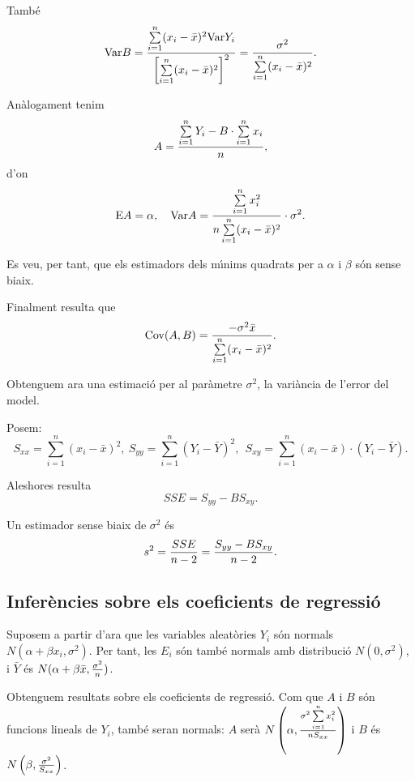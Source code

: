 Tamb\'e
$${\rm Var} B = {\sum\limits_{i=1}^n (x_i - \bar{x})^2 {\rm Var} Y_i \over \left[
\sum\limits_{i=1}^n (x_i - \bar{x})^2 \right]^2} = {\sigma^2 \over
\sum\limits_{i=1}^n (x_i - \bar{x})^2}.$$

An\`alogament tenim
$$A = {\sum\limits_{i=1}^n Y_i - B \cdot \sum\limits_{i=1}^n x_i \over n},$$
d'on
$${\rm E}A = \alpha, \quad{\rm Var} A = {\sum\limits_{i=1}^n x_i^2 \over n
\sum\limits_{i=1}^n (x_i - \bar{x})^2} \cdot \sigma^2.$$

Es veu, per tant, que els estimadors dels m\'{\i}nims quadrats per a $\alpha$ i 
$\beta$ s\'on sense biaix.

Finalment resulta que
$${\rm Cov} (A,B) = {- \sigma^2 \bar{x} \over \sum\limits_{i=1}^n (x_i - \bar{x})^2}.$$

Obtenguem ara una estimaci\'o per al par\`ametre $\sigma^2$, la vari\`ancia de
l'error del model.

Posem:
$$S_{xx} = \sum_{i=1}^n (x_i - \bar{x})^2, \ S_{yy} = \sum_{i=1}^n (Y_i -
\bar{Y})^2, \ \ S_{xy} = \sum_{i=1}^n (x_i - \bar{x}) \cdot (Y_i - \bar{Y}).$$

Aleshores resulta $$SSE = S_{yy} - B S_{xy}.$$

\begin{proposition}
Un estimador sense biaix de $\sigma^2$ \'es
$$s^2 = {SSE \over n-2} = {S_{yy} - B S_{xy} \over n-2}.$$
\end{proposition}

\subsection{Infer\`encies sobre els coeficients de regressi\'o}

Suposem a partir d'ara que les variables aleat\`ories $Y_i$ s\'on normals\break
$N(\alpha + \beta x_i,\sigma^2)$. Per tant, les $E_i$ s\'on tamb\'e normals 
amb distribuci\'o
$N(0,\sigma^2)$, i $\bar{Y}$ \'es $N(\alpha + \beta \bar{x},
{\sigma^2 \over n})$.

Obtenguem resultats sobre els coeficients de regressi\'o. 
Com que $A$ i $B$
s\'on funcions lineals de $Y_i$, tamb\'e seran normals: $A$ ser\`a 
$N\left(\alpha,{\sigma^2 \sum\limits_{i=1}^n x_i^2 \over n S_{xx}}\right)$
i $B$ \'es $N\left(\beta,{\sigma^2 \over S_{xx}}\right)$.

